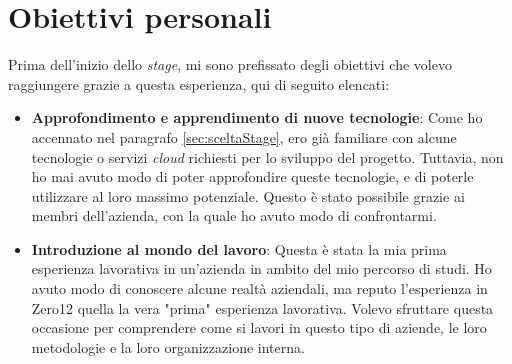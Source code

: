 \section{Obiettivi personali}
Prima dell'inizio dello \textit{stage}, mi sono prefissato degli obiettivi che volevo raggiungere grazie a questa esperienza, qui di seguito elencati:
\begin{itemize}
    \item \textbf{Approfondimento e apprendimento di nuove tecnologie}: Come ho accennato nel paragrafo \ref{sec:sceltaStage}, ero già familiare con alcune tecnologie o servizi \textit{cloud} richiesti per lo sviluppo del progetto. Tuttavia, non ho mai avuto modo di poter approfondire queste tecnologie, e di poterle utilizzare al loro massimo potenziale. Questo è stato possibile grazie ai membri dell'azienda, con la quale ho avuto modo di confrontarmi.
    \item \textbf{Introduzione al mondo del lavoro}: Questa è stata la mia prima esperienza lavorativa in un'azienda in ambito del mio percorso di studi. Ho avuto modo di conoscere alcune realtà aziendali, ma reputo l'esperienza in Zero12 quella la vera "prima" esperienza lavorativa. Volevo sfruttare questa occasione per comprendere come si lavori in questo tipo di aziende, le loro metodologie e la loro organizzazione interna. 
\end{itemize}